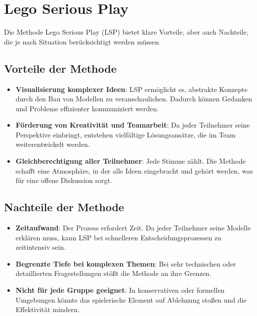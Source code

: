 \section{Lego Serious Play}

Die Methode Lego Serious Play (LSP) bietet klare Vorteile, aber auch Nachteile, die je nach Situation berücksichtigt werden müssen.

\subsection{Vorteile der Methode}
\begin{itemize}
    \item \textbf{Visualisierung komplexer Ideen}: LSP ermöglicht es, abstrakte Konzepte durch den Bau von Modellen zu veranschaulichen. Dadurch können Gedanken und Probleme effizienter kommuniziert werden.
    \item \textbf{Förderung von Kreativität und Teamarbeit}: Da jeder Teilnehmer seine Perspektive einbringt, entstehen vielfältige Lösungsansätze, die im Team weiterentwickelt werden.
    \item \textbf{Gleichberechtigung aller Teilnehmer}: Jede Stimme zählt. Die Methode schafft eine Atmosphäre, in der alle Ideen eingebracht und gehört werden, was für eine offene Diskussion sorgt.
\end{itemize}

\subsection{Nachteile der Methode}
\begin{itemize}
    \item \textbf{Zeitaufwand}: Der Prozess erfordert Zeit. Da jeder Teilnehmer seine Modelle erklären muss, kann LSP bei schnelleren Entscheidungsprozessen zu zeitintensiv sein.
    \item \textbf{Begrenzte Tiefe bei komplexen Themen}: Bei sehr technischen oder detaillierten Fragestellungen stößt die Methode an ihre Grenzen.
    \item \textbf{Nicht für jede Gruppe geeignet}: In konservativen oder formellen Umgebungen könnte das spielerische Element auf Ablehnung stoßen und die Effektivität mindern.
\end{itemize}

